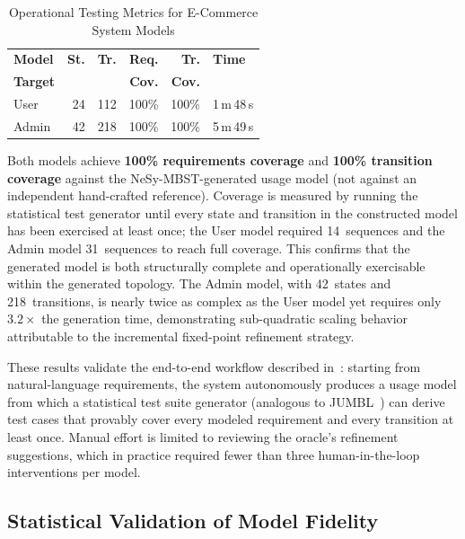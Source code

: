 \begin{table}[!t]
\centering
\caption{Operational Testing Metrics for E-Commerce System Models}
\label{tab:operational_metrics}
\renewcommand{\arraystretch}{1.2}
\setlength{\tabcolsep}{5pt}
\begin{tabular}{l r r r r l}
\hline\hline
\textbf{Model} & \textbf{St.} & \textbf{Tr.} &
\textbf{Req.} & \textbf{Tr.} & \textbf{Time} \\
\textbf{Target} & & & \textbf{Cov.} & \textbf{Cov.} & \\
\hline
User   & 24  & 112 & 100\% & 100\% & 1\,m\,48\,s \\
Admin  & 42  & 218 & 100\% & 100\% & 5\,m\,49\,s \\
\hline\hline
\end{tabular}
\end{table}

Both models achieve \textbf{100\% requirements coverage} and
\textbf{100\% transition coverage} against the NeSy-MBST-generated usage
model (not against an independent hand-crafted reference).  Coverage is
measured by running the statistical test generator until every state and
transition in the constructed model has been exercised at least once;
the User model required 14~sequences and the Admin model 31~sequences
to reach full coverage.  This confirms that the generated model is both
structurally complete and operationally exercisable within the generated
topology.  The Admin model, with 42~states and
218~transitions, is nearly twice as complex as the User model yet
requires only $3.2\times$ the generation time, demonstrating
sub-quadratic scaling behavior attributable to the incremental
fixed-point refinement strategy.

These results validate the end-to-end workflow described
in~\cite{ecommerce_mbst}: starting from natural-language requirements,
the system autonomously produces a usage model from which a statistical
test suite generator (analogous to JUMBL~\cite{whittaker1993markov,whittaker1994markov}) can
derive test cases that provably cover every modeled requirement and every
transition at least once.  Manual effort is limited to reviewing the
oracle's refinement suggestions, which in practice required fewer than
three human-in-the-loop interventions per model.


\subsection{Statistical Validation of Model Fidelity}
\label{sec:eval:statistical}

